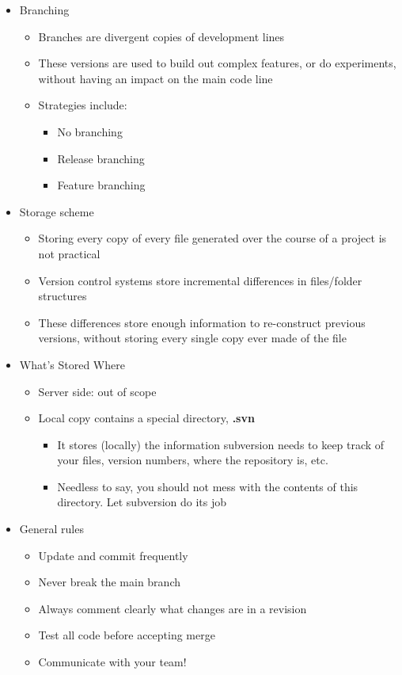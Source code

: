 \documentclass[11pt]{article}
\begin{document}
\begin{itemize}
	\item Branching
		\begin{itemize}
			\item Branches are divergent copies of development lines
					\item These versions are used to build out complex features, or do experiments,
					without having an impact on the main code line
			\item Strategies include:
				\begin{itemize}
					\item No branching
					\item Release branching
					\item Feature branching
				\end{itemize}
		\end{itemize}

	\item Storage scheme
		\begin{itemize}
			\item Storing every copy of every file generated over the course of a project is not practical
			\item Version control systems store incremental differences in files/folder structures
			\item These differences store enough information to re-construct previous versions, without storing every single copy ever made of the file
		\end{itemize}

	\item What’s Stored Where
		\begin{itemize}
			\item Server side: out of scope
			\item Local copy contains a special directory, \textbf{.svn}
				\begin{itemize}
					\item It stores (locally) the information subversion needs to keep track of your files, version numbers, where the repository is, etc.
					\item Needless to say, you should not mess with the contents of this directory. Let subversion do its job
				\end{itemize}
		\end{itemize}

	\item General rules
		\begin{itemize}
			\item Update and commit frequently
			\item Never break the main branch
			\item Always comment clearly what changes are in a revision
			\item Test all code before accepting merge
			\item Communicate with your team!
		\end{itemize}
\end{itemize}
\end{document}
